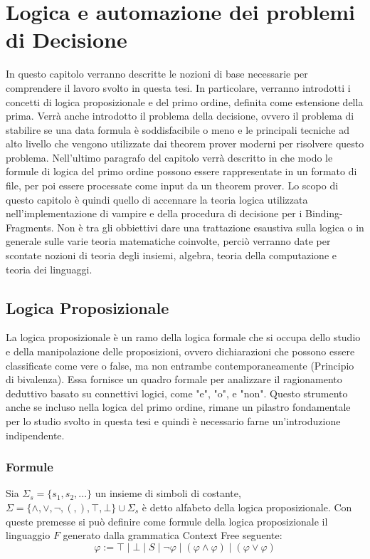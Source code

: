 \documentclass[./main.tex]{subfiles}
\begin{document}
\chapter{Logica e automazione dei problemi di Decisione}

In questo capitolo verranno descritte le nozioni di base necessarie 
per comprendere il lavoro svolto in questa tesi. 
In particolare, verranno introdotti i concetti di logica proposizionale e 
del primo ordine, definita come estensione della prima.
Verrà anche introdotto il problema della decisione, ovvero il problema di stabilire se una data formula è soddisfacibile o meno
e le principali tecniche ad alto livello che vengono utilizzate dai theorem prover moderni per risolvere questo problema.
Nell'ultimo paragrafo del capitolo 
verrà descritto in che modo le formule di logica del 
primo ordine possono essere rappresentate in un formato di file, per poi essere 
processate come input da un theorem prover. 
Lo scopo di questo capitolo è quindi quello di accennare la teoria logica utilizzata nell'implementazione di vampire 
e della procedura di decisione per i Binding-Fragments.
Non è tra gli obbiettivi dare una trattazione esaustiva sulla logica o in generale sulle varie teoria matematiche coinvolte, 
perciò verranno date per scontate nozioni di teoria degli insiemi,
algebra, teoria della computazione e teoria dei linguaggi.



\section{Logica Proposizionale}

La logica proposizionale è un ramo della logica formale che si occupa dello studio e della manipolazione delle proposizioni, 
ovvero dichiarazioni che possono essere classificate come vere o false, ma non entrambe contemporaneamente (Principio di bivalenza).
Essa fornisce un quadro formale per analizzare il ragionamento deduttivo basato su connettivi logici, come "e", "o", e "non".
Questo strumento anche se incluso nella logica del primo ordine,
rimane un pilastro fondamentale per lo studio svolto in questa tesi e quindi è necessario farne un'introduzione indipendente.

\subsection{Formule} \label{sec:sintassi_bool}
Sia $\Sigma_s = \{s_1, s_2, ...\}$ un insieme di simboli di costante, 
$\Sigma = \{ \land, \lor, \lnot, (, ), \top, \bot\} \cup \Sigma_s$ è detto alfabeto della logica proposizionale. 
Con queste premesse si può definire come formule della logica proposizionale il linguaggio $F$ generato dalla
grammatica Context Free seguente:
$$
\varphi  := \top \mid \bot \mid S \mid \lnot \varphi \mid (\varphi \land \varphi) \mid (\varphi \lor \varphi)
$$
\end{document}
